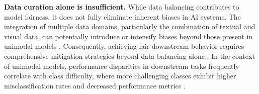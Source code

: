 \textbf{Data curation alone is insufficient.} While data balancing contributes to model fairness, it does not fully eliminate inherent biases in AI systems. The integration of multiple data domains, particularly the combination of textual and visual data, can potentially introduce or intensify biases beyond those present in unimodal models \cite{hall_vision-language_2023, hutchinson_underspecification_2022, booth_bias_2021}. Consequently, achieving fair downstream behavior requires comprehensive mitigation strategies beyond data balancing alone \cite{alabdulmohsin_clip_2024}. In the context of unimodal models, performance disparities in downstream tasks frequently correlate with class difficulty, where more challenging classes exhibit higher misclassification rates and decreased performance metrics \cite{cui_classes_nodate}.